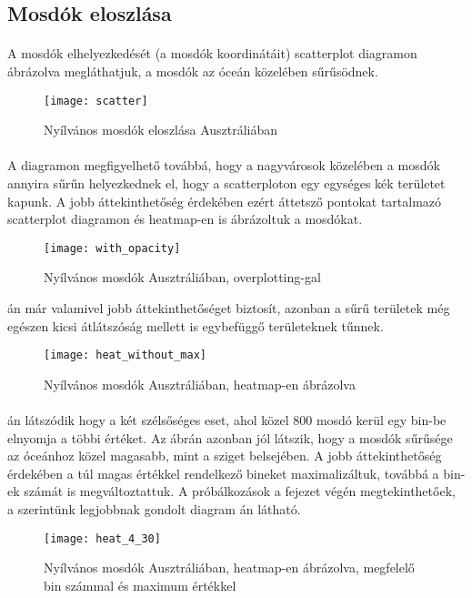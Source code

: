 	\subsection{Mosdók eloszlása}
	\paragraph{}
	A mosdók elhelyezkedését (a mosdók koordinátáit) scatterplot diagramon ábrázolva megláthatjuk, a mosdók az óceán közelében sűrűsödnek.
	\begin{figure}[!ht]
		\centering
			\texttt{[image: scatter]}
			\caption{Nyílvános mosdók eloszlása Ausztráliában}
	\end{figure}
	\paragraph{}
	A diagramon megfigyelhető továbbá, hogy a nagyvárosok közelében a mosdók annyira sűrűn helyezkednek el, hogy a scatterploton egy egységes kék területet kapunk. A jobb áttekinthetőség érdekében ezért áttetsző pontokat tartalmazó scatterplot diagramon és heatmap-en is ábrázoltuk a mosdókat.
	\begin{figure}[!ht]
		\centering	
			\texttt{[image: with\_opacity]}
			\caption{Nyílvános mosdók Ausztráliában, overplotting-gal}
			\label{fig:with_opacity}
	\end{figure}
	\par
	án már valamivel jobb áttekinthetőséget biztosít, azonban a sűrű területek még egészen kicsi átlátszóság mellett is egybefüggő területeknek tűnnek.
	\begin{figure}[!ht]
		\centering	
			\texttt{[image: heat\_without\_max]}
			\caption{Nyílvános mosdók Ausztráliában, heatmap-en ábrázolva}
			\label{fig:heat_without_max}
	\end{figure}
	\paragraph{}
	án látszódik hogy a két szélsőséges eset, ahol közel 800 mosdó kerül egy bin-be elnyomja a többi értéket. Az ábrán azonban jól látszik, hogy a mosdók sűrűsége az óceánhoz közel magasabb, mint a sziget belsejében. A jobb áttekinthetőség érdekében a túl magas értékkel rendelkező bineket maximalizáltuk, továbbá a bin-ek számát is megváltoztattuk. A próbálkozások a fejezet végén megtekinthetőek, a szerintünk legjobbnak gondolt diagram án látható.	
	\begin{figure}[!ht]
		\centering	
			\texttt{[image: heat\_4\_30]}
			\caption{Nyílvános mosdók Ausztráliában, heatmap-en ábrázolva, megfelelő bin számmal és maximum értékkel}
			\label{fig:heat_4_30}
	\end{figure}
	\clearpage
